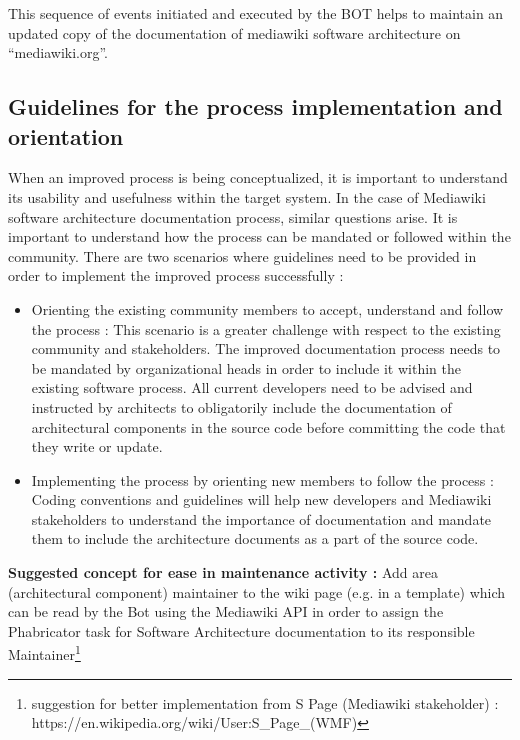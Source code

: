 This sequence of events initiated and executed by the BOT helps to maintain an updated copy of the documentation of mediawiki software architecture on \enquote{mediawiki.org}.  

\subsection{Guidelines for the process implementation and orientation}
When an improved process is being conceptualized, it is important to understand its usability and usefulness within the target system. In the case of Mediawiki software architecture documentation process, similar questions arise. It is important to understand how the process can be mandated or followed within the community.
\indent There are two scenarios where guidelines need to be provided in order to implement the improved process successfully \cite{Employee} :
\begin{itemize}
\item Orienting the existing community members to accept, understand and follow the process : 
\newline This scenario is a greater challenge with respect to the existing community and stakeholders. The improved documentation process needs to be mandated by organizational heads in order to include it within the existing software process. All current developers need to be advised and instructed by architects to obligatorily include the documentation of architectural components in the source code before committing the code that they write or update. 
\item Implementing the process by orienting new members to follow the process :
\newline Coding conventions and guidelines will help new developers and Mediawiki stakeholders to understand the importance of documentation and mandate them to include the architecture documents as a part of the source code.
\end{itemize}

\textbf{Suggested concept for ease in maintenance activity  :} Add area (architectural component) maintainer to the wiki page (e.g. in a template) which can be read by the Bot using the Mediawiki API in order to assign the Phabricator task for Software Architecture documentation to its responsible Maintainer\footnote{suggestion for better implementation from S Page (Mediawiki stakeholder) : https://en.wikipedia.org/wiki/User:S\_Page\_(WMF) }



